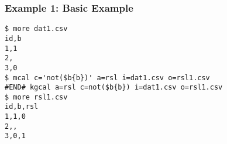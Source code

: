 \subsubsection*{Example 1: Basic Example}



\begin{Verbatim}[baselinestretch=0.7,frame=single]
$ more dat1.csv
id,b
1,1
2,
3,0
$ mcal c='not($b{b})' a=rsl i=dat1.csv o=rsl1.csv
#END# kgcal a=rsl c=not($b{b}) i=dat1.csv o=rsl1.csv
$ more rsl1.csv
id,b,rsl
1,1,0
2,,
3,0,1
\end{Verbatim}
